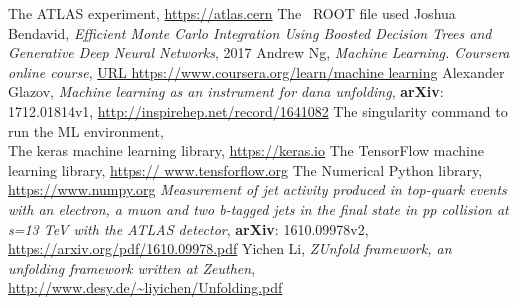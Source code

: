 \begin{thebibliography}{11}

 The ATLAS experiment, \url{https://atlas.cern}
 The \ttbaremu~ROOT file used {\tiny \texttt{}}
 Joshua Bendavid, \textit{Efficient Monte Carlo Integration Using Boosted Decision Trees and Generative Deep Neural Networks}, 2017
 Andrew Ng, \textit{Machine Learning. Coursera online course}, \url{URL https://www.coursera.org/learn/machine learning}
 Alexander Glazov, \textit{Machine learning as an instrument for dana unfolding}, \textbf{arXiv}: 1712.01814v1, \url{http://inspirehep.net/record/1641082}
 The singularity command to run the ML environment, \\ {\tiny \texttt {}}
 The keras machine learning library, \url{https://keras.io}
 The TensorFlow machine learning library, \url{https:// www.tensforflow.org}
 The Numerical Python library, \url{https://www.numpy.org}
 \textit{Measurement of jet activity produced in top-quark events with an electron, a muon and two b-tagged jets in the final state in pp collision at s=13 TeV with the ATLAS detector}, \textbf{arXiv}: 1610.09978v2, \url{https://arxiv.org/pdf/1610.09978.pdf}
 Yichen Li, \textit{ZUnfold framework, an unfolding framework written at Zeuthen}, \url{http://www.desy.de/~liyichen/Unfolding.pdf}

\end{thebibliography}
